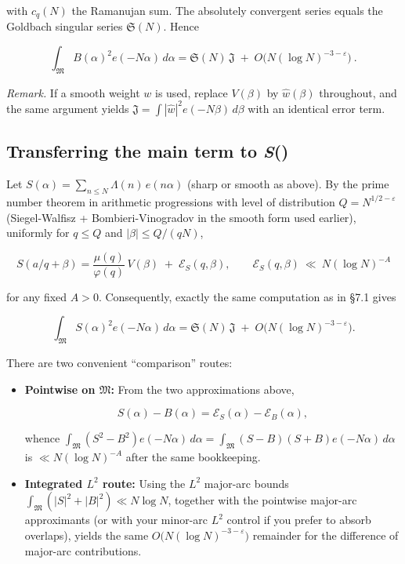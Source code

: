 \documentclass[11pt]{article}
\theoremstyle{definition}
\theoremstyle{remark}
\numberwithin{equation}{part}
\begin{document}
with $c_q(N)$ the Ramanujan sum. The absolutely convergent series equals the Goldbach singular series $\mathfrak S(N)$. Hence

$$
	\boxed{\,\int_{\mathfrak M} B(\alpha)^2 e(-N\alpha)\,d\alpha
		=\mathfrak S(N)\,\mathfrak J\;+\;O\!\big(N(\log N)^{-3-\varepsilon}\big)\ .\ }
$$

\emph{Remark.} If a smooth weight $w$ is used, replace $V(\beta)$ by $\widehat w(\beta)$ throughout, and the same argument yields $\mathfrak J=\int|\widehat w|^2 e(-N\beta)\,d\beta$ with an identical error term.

\subsection{Transferring the main term to \textit{S}(\textalpha)}

Let $S(\alpha)=\sum_{n\le N}\Lambda(n)\,e(n\alpha)$ (sharp or smooth as above). By the prime number theorem in arithmetic progressions with level of distribution $Q=N^{1/2-\varepsilon}$ (Siegel-Walfisz + Bombieri-Vinogradov in the smooth form used earlier), uniformly for $q\le Q$ and $|\beta|\le Q/(qN)$,

$$
	S(a/q+\beta)=\frac{\mu(q)}{\varphi(q)}\,V(\beta) \;+\; \mathcal E_S(q,\beta),
	\qquad \mathcal E_S(q,\beta)\ \ll\ N(\log N)^{-A}
$$

for any fixed $A>0$. Consequently, exactly the same computation as in §7.1 gives

$$
	\int_{\mathfrak M} S(\alpha)^2 e(-N\alpha)\,d\alpha
	=\mathfrak S(N)\,\mathfrak J\;+\;O\!\big(N(\log N)^{-3-\varepsilon}\big).
$$

There are two convenient “comparison” routes:

\begin{itemize}
	\item \textbf{Pointwise on $\mathfrak M$:} From the two approximations above,

	      $$
		      S(\alpha)-B(\alpha)=\mathcal E_S(\alpha)-\mathcal E_B(\alpha),
	      $$

	      whence $\int_{\mathfrak M}(S^2-B^2)e(-N\alpha)\,d\alpha =\int_{\mathfrak M}(S-B)(S+B)e(-N\alpha)\,d\alpha$
	      is $\ll N(\log N)^{-A}$ after the same bookkeeping.

	\item \textbf{Integrated $L^2$ route:} Using the $L^2$ major-arc bounds $\int_{\mathfrak M}(|S|^2+|B|^2)\ll N\log N$, together with the pointwise major-arc approximants (or with your minor-arc $L^2$ control if you prefer to absorb overlaps), yields the same $O\big(N(\log N)^{-3-\varepsilon}\big)$ remainder for the difference of major-arc contributions.
\end{itemize}
\end{document}
